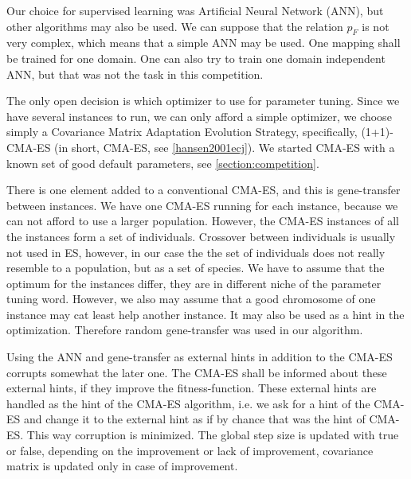 \documentclass{article}
\begin{document}
Our choice for supervised learning was Artificial Neural Network (ANN), but other algorithms may also be used. We can suppose that the relation \begin{math}p_F\end{math} is not very complex, which means that a simple ANN may be used. One mapping shall be trained for one domain. One can also try to train one domain independent ANN, but that was not the task in this competition.

The only open decision is which optimizer to use for parameter tuning. Since we have several instances to run, we can only afford a simple optimizer, we choose simply a Covariance Matrix Adaptation Evolution Strategy, specifically, (1+1)-CMA-ES (in short, CMA-ES, see \ref{hansen2001ecj}). We started CMA-ES with a known set of good default parameters, see \ref{section:competition}.

There is one element added to a conventional CMA-ES, and this is gene-transfer between instances. We have one CMA-ES running for each instance, because we can not afford to use a larger population. However, the CMA-ES instances of all the instances form a set of individuals. Crossover between individuals is usually not used in ES, however, in our case the the set of individuals does not really resemble to a population, but as a set of species. We have to assume that the optimum for the instances differ, they are in different niche of the parameter tuning word. However, we also may assume that a good chromosome of one instance may cat least help another instance. It may also be used as a hint in the optimization. Therefore random gene-transfer was used in our algorithm. 

Using the ANN and gene-transfer as external hints in addition to the CMA-ES corrupts somewhat the later one. The CMA-ES shall be informed about these external hints, if they improve the fitness-function. These external hints are handled as the hint of the CMA-ES algorithm, i.e. we ask for a hint of the CMA-ES and change it to the external hint as if by chance that was the hint of CMA-ES. This way corruption is minimized. The global step size is updated with true or false, depending on the improvement or lack of improvement, covariance matrix is updated only in case of improvement.
\end{document}
